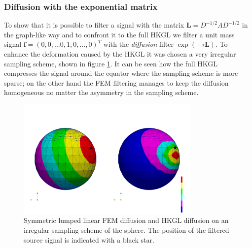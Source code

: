 \subsubsection{Diffusion with the exponential matrix}

To show that it is possible to filter a signal with the matrix $\mathbf L = D^{-1/2}AD^{-1/2}$ in the graph-like way and to confront it to the full HKGL we filter a unit mass signal $\mathbf{f}=(0,0,...0,1,0,...,0)^T$ with the \textit{diffusion} filter $\exp{(-\tau \mathbf L)}$. To enhance the deformation caused by the HKGL it was chosen a very irregular sampling scheme, shown in figure \ref{fig:FEM lumped symmetric diffusion on irregular sampling}. It can be seen how the full HKGL compresses the signal around the equator where the sampling scheme is more sparse; on the other hand the FEM filtering manages to keep the diffusion homogeneous no matter the asymmetry in the sampling scheme. 
\begin{figure}[h]
	\centering
	\includegraphics[width=0.8\textwidth]{figs/Chapter3/diffusion.png}
	\caption{\label{fig:FEM lumped symmetric diffusion on irregular sampling}Symmetric lumped linear FEM diffusion and HKGL diffusion on an irregular sampling scheme of the sphere. The position of the filtered source signal is indicated with a black star.}
\end{figure}






